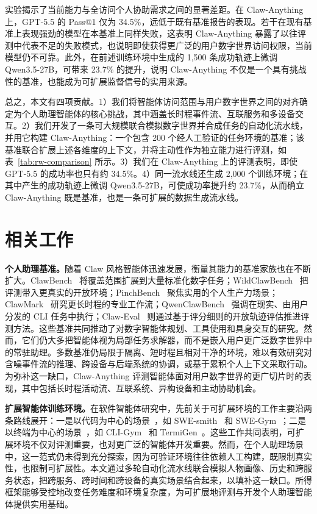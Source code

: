 \documentclass[10pt]{article}
\begin{document}
实验揭示了当前能力与全访问个人协助需求之间的显著差距。在 Claw-Anything 上，GPT-5.5 的 Pass@1 仅为 34.5\%，远低于既有基准报告的表现。若干在现有基准上表现强劲的模型在本基准上同样失败，这表明 Claw-Anything 暴露了以往评测中代表不足的失败模式，也说明即使获得更广泛的用户数字世界访问权限，当前模型仍不可靠。此外，在前述训练环境中生成的 1,500 条成功轨迹上微调 Qwen3.5-27B，可带来 23.7\% 的提升，说明 Claw-Anything 不仅是一个具有挑战性的基准，也能成为可扩展监督信号的实用来源。

总之，本文有四项贡献。1）我们将智能体访问范围与用户数字世界之间的对齐确定为个人助理智能体的核心挑战，其中涵盖长时程事件流、互联服务和多设备交互。2）我们开发了一条可大规模联合模拟数字世界并合成任务的自动化流水线，并用它构建 Claw-Anything：一个包含 200 个经人工验证的任务环境的基准；该基准联合扩展上述各维度的上下文，并将主动性作为独立能力进行评测，如表~\ref{tab:rw-comparison} 所示。3）我们在 Claw-Anything 上的评测表明，即使 GPT-5.5 的成功率也只有约 34.5\%。4）同一流水线还生成 2,000 个训练环境；在其中产生的成功轨迹上微调 Qwen3.5-27B，可使成功率提升约 23.7\%，从而确立 Claw-Anything 既是基准，也是一条可扩展的数据生成流水线。

\section{相关工作}
\label{sec:related}

\textbf{个人助理基准。}随着 Claw 风格智能体迅速发展，衡量其能力的基准家族也在不断扩大。ClawBench~\citep{clawbench} 将覆盖范围扩展到大量标准化数字任务；WildClawBench~\citep{wildclawbench} 把评测带入更真实的开放环境；PinchBench~\citep{pinchbench} 聚焦实用的个人生产力场景；ClawMark~\citep{clawmark} 研究更长时程的专业工作流；QwenClawBench~\citep{qwenclawbench} 强调在现实、由用户分发的 CLI 任务中执行；Claw-Eval~\citep{claweval} 则通过基于评分细则的开放轨迹评估推进评测方法。这些基准共同推动了对数字智能体规划、工具使用和具身交互的研究。然而，它们仍大多把智能体视为局部任务求解器，而不是嵌入用户更广泛数字世界中的常驻助理。多数基准仍局限于隔离、短时程且相对干净的环境，难以有效研究对含噪事件流的推理、跨设备与后端系统的协调，或基于累积个人上下文采取行动。为弥补这一缺口，Claw-Anything 评测智能体面对用户数字世界的更广切片时的表现，其中包括长时程活动流、互联系统、异构设备和主动协助机会。

\textbf{扩展智能体训练环境。}在软件智能体研究中，先前关于可扩展环境的工作主要沿两条路线展开：一是以代码为中心的场景~\citep{swebench,featurebench}，如 SWE-smith~\citep{swesmith} 和 SWE-Gym~\citep{swe-gym}；二是以终端为中心的场景~\citep{terminalbench2026}，如 CLI-Gym~\citep{cli-gym} 和 TermiGen~\citep{termigen}。这些工作共同表明，可扩展环境不仅对评测重要，也对更广泛的智能体开发重要。然而，在个人助理场景中，这一范式仍未得到充分探索，因为可验证环境往往依赖人工构建，既限制真实性，也限制可扩展性。本文通过多轮自动化流水线联合模拟人物画像、历史和跨服务状态，把跨服务、跨时间和跨设备的真实场景结合起来，以填补这一缺口。所得框架能够受控地改变任务难度和环境复杂度，为可扩展地评测与开发个人助理智能体提供实用基础。
\end{document}

